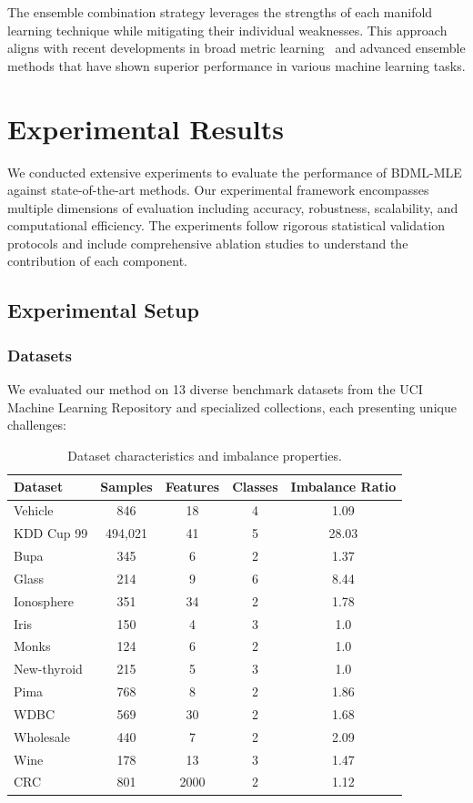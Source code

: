\documentclass[review]{elsarticle}
\begin{document}
The ensemble combination strategy leverages the strengths of each manifold learning technique while mitigating their individual weaknesses. This approach aligns with recent developments in broad metric learning~\cite{bs2025distance} and advanced ensemble methods that have shown superior performance in various machine learning tasks.

\section{Experimental Results}

We conducted extensive experiments to evaluate the performance of BDML-MLE against state-of-the-art methods. Our experimental framework encompasses multiple dimensions of evaluation including accuracy, robustness, scalability, and computational efficiency. The experiments follow rigorous statistical validation protocols and include comprehensive ablation studies to understand the contribution of each component.

\subsection{Experimental Setup}

\subsubsection{Datasets}

We evaluated our method on 13 diverse benchmark datasets from the UCI Machine Learning Repository and specialized collections, each presenting unique challenges:

\begin{table}[htbp]
\centering
\caption{Dataset characteristics and imbalance properties.}
\label{tab:datasets}
\begin{tabular}{lcccc}
\toprule
Dataset & Samples & Features & Classes & Imbalance Ratio \\
\midrule
Vehicle & 846 & 18 & 4 & 1.09 \\
KDD Cup 99 & 494,021 & 41 & 5 & 28.03 \\
Bupa & 345 & 6 & 2 & 1.37 \\
Glass & 214 & 9 & 6 & 8.44 \\
Ionosphere & 351 & 34 & 2 & 1.78 \\
Iris & 150 & 4 & 3 & 1.0 \\
Monks & 124 & 6 & 2 & 1.0 \\
New-thyroid & 215 & 5 & 3 & 1.0 \\
Pima & 768 & 8 & 2 & 1.86 \\
WDBC & 569 & 30 & 2 & 1.68 \\
Wholesale & 440 & 7 & 2 & 2.09 \\
Wine & 178 & 13 & 3 & 1.47 \\
CRC & 801 & 2000 & 2 & 1.12 \\
\bottomrule
\end{tabular}
\end{table}
\end{document}
